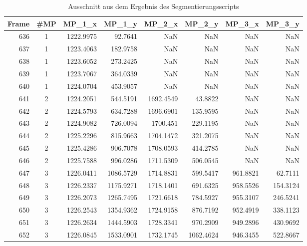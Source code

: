 \begin{table}[]
    \caption{Ausschnitt aus dem Ergebnis des Segmentierungsscripts}
	\small
	\centering
    \begin{tabular}{@{}rcrrrrrr@{}}
    \toprule
    Frame   & \#MP & MP\_1\_x  & MP\_1\_y  & MP\_2\_x  & MP\_2\_y  & MP\_3\_x & MP\_3\_y \\ \midrule
    636     & 1    & 1222.9975 & 92.7641   & NaN       & NaN       & NaN      & NaN      \\
    637     & 1    & 1223.4063 & 182.9758  & NaN       & NaN       & NaN      & NaN      \\
    638     & 1    & 1223.6052 & 273.2425  & NaN       & NaN       & NaN      & NaN      \\
    639     & 1    & 1223.7067 & 364.0339  & NaN       & NaN       & NaN      & NaN      \\
    640     & 1    & 1224.0704 & 453.9057  & NaN       & NaN       & NaN      & NaN      \\
    641     & 2    & 1224.2051 & 544.5191  & 1692.4549 & 43.8822   & NaN      & NaN      \\
    642     & 2    & 1224.5793 & 634.7288  & 1696.6901 & 135.9595  & NaN      & NaN      \\
    643     & 2    & 1224.9082 & 726.0094  & 1700.451  & 229.1195  & NaN      & NaN      \\
    644     & 2    & 1225.2296 & 815.9663  & 1704.1472 & 321.2075  & NaN      & NaN      \\
    645     & 2    & 1225.4286 & 906.7078  & 1708.0593 & 414.2785  & NaN      & NaN      \\
    646     & 2    & 1225.7588 & 996.0286  & 1711.5309 & 506.0545  & NaN      & NaN      \\
    647     & 3    & 1226.0411  & 1086.5729 & 1714.8831 & 599.5417  & 961.8821 & 62.7111 \\
    648     & 3    & 1226.2337 & 1175.9271 & 1718.1401 & 691.6325  & 958.5526 & 154.3124 \\
    649     & 3    & 1226.2073 & 1265.7495 & 1721.6618 & 784.5927  & 955.3107 & 246.5241 \\
    650     & 3    & 1226.2543 & 1354.9362 & 1724.9158 & 876.7192  & 952.4919 & 338.1123 \\
    651     & 3    & 1226.2634 & 1444.5903 & 1728.3341 & 970.2909  & 949.2896 & 430.9692 \\
    652     & 3    & 1226.0845 & 1533.0901 & 1732.1745 & 1062.4624 & 946.3455 & 522.8667 \\

\end{tabular}
\end{table}
